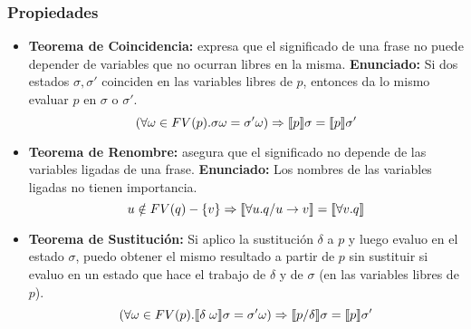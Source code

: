  \subsubsection*{Propiedades}
    \begin{itemize}
      \item \textbf{Teorema de Coincidencia:} expresa que el significado de una frase no puede depender de variables que no ocurran libres en la misma.
        \PN \textbf{Enunciado:} Si dos estados $\sigma, \sigma'$ coinciden en las variables libres de $p$, entonces da lo mismo evaluar $p$ en $\sigma$ o $\sigma'$.
        \[
          (\forall \omega \in FV(p) . \sigma \omega = \sigma' \omega) \Rightarrow \llbracket p\rrbracket \sigma = \llbracket p\rrbracket \sigma'
        \] 
      \item \textbf{Teorema de Renombre:} asegura que el significado no depende de las variables ligadas de una frase.
        \PN \textbf{Enunciado:} Los nombres de las variables ligadas no tienen importancia.
        \[
          u \notin FV(q) - \{v\} \Rightarrow \llbracket\forall u . q/u \rightarrow v\rrbracket = \llbracket\forall v . q\rrbracket
        \]
      \item \textbf{Teorema de Sustitución:} Si aplico la sustitución $\delta$ a $p$ y luego evaluo en el estado $\sigma$, puedo obtener el mismo resultado a partir de $p$ sin sustituir si evaluo en un estado que hace el trabajo de $\delta$ y de $\sigma$ (en las variables libres de $p$).
        \[
          (\forall \omega \in FV(p) . \llbracket\delta \; \omega\rrbracket \sigma = \sigma' \omega) \Rightarrow \llbracket p/\delta\rrbracket \sigma = \llbracket p\rrbracket \sigma'
        \]
    \end{itemize}